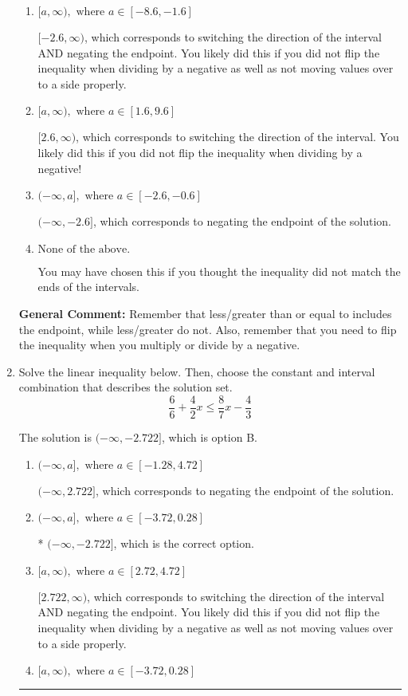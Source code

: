 \documentclass{extbook}[14pt]
\newcommand{\litem}[1]{\item #1

\rule{\textwidth}{0.4pt}}
\begin{document}
\begin{enumerate}
{\begin{enumerate}[label=\Alph*.]
* $(-\infty, 2.6]$, which is the correct option.
\item \( [a, \infty), \text{ where } a \in [-8.6, -1.6] \)

 $[-2.6, \infty)$, which corresponds to switching the direction of the interval AND negating the endpoint. You likely did this if you did not flip the inequality when dividing by a negative as well as not moving values over to a side properly.
\item \( [a, \infty), \text{ where } a \in [1.6, 9.6] \)

 $[2.6, \infty)$, which corresponds to switching the direction of the interval. You likely did this if you did not flip the inequality when dividing by a negative!
\item \( (-\infty, a], \text{ where } a \in [-2.6, -0.6] \)

 $(-\infty, -2.6]$, which corresponds to negating the endpoint of the solution.
\item \( \text{None of the above}. \)

You may have chosen this if you thought the inequality did not match the ends of the intervals.
\end{enumerate}

\textbf{General Comment:} Remember that less/greater than or equal to includes the endpoint, while less/greater do not. Also, remember that you need to flip the inequality when you multiply or divide by a negative.
}
\litem{
Solve the linear inequality below. Then, choose the constant and interval combination that describes the solution set.
\[ \frac{6}{6} + \frac{4}{2} x \leq \frac{8}{7} x - \frac{4}{3} \]

The solution is \( (-\infty, -2.722] \), which is option B.\begin{enumerate}[label=\Alph*.]
\item \( (-\infty, a], \text{ where } a \in [-1.28, 4.72] \)

 $(-\infty, 2.722]$, which corresponds to negating the endpoint of the solution.
\item \( (-\infty, a], \text{ where } a \in [-3.72, 0.28] \)

* $(-\infty, -2.722]$, which is the correct option.
\item \( [a, \infty), \text{ where } a \in [2.72, 4.72] \)

 $[2.722, \infty)$, which corresponds to switching the direction of the interval AND negating the endpoint. You likely did this if you did not flip the inequality when dividing by a negative as well as not moving values over to a side properly.
\item \( [a, \infty), \text{ where } a \in [-3.72, 0.28] \)


\end{enumerate}}
\end{enumerate}
\end{document}
